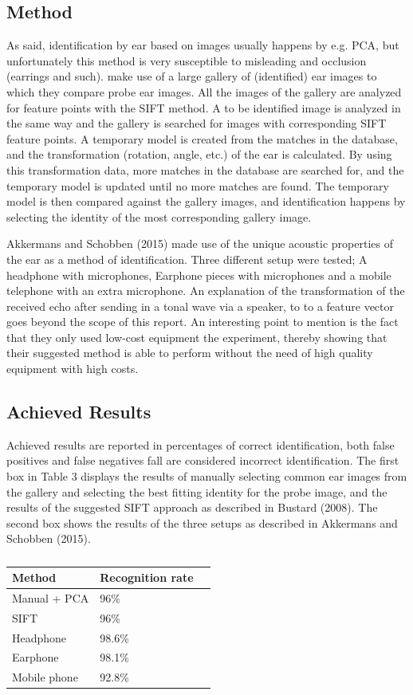 \documentclass{article}
\begin{document}
\subsection{Method}
As said, identification by ear based on images usually happens by e.g. PCA, but unfortunately this method is very susceptible to misleading and occlusion (earrings and such).
\cite{bustard2008robust} make use of a large gallery of (identified) ear images to which they compare probe ear images.
All the images of the gallery are analyzed for feature points with the SIFT\cite{lowe1999object} method.
A to be identified image is analyzed in the same way and the gallery is searched for images with corresponding SIFT feature points.
A temporary model is created from the matches in the database, and the transformation (rotation, angle, etc.) of the ear is calculated.
By using this transformation data, more matches in the database are searched for, and the temporary model is updated until no more matches are found.
The temporary model is then compared against the gallery images, and identification happens by selecting the identity of the most corresponding gallery image.

Akkermans and Schobben (2015) made use of the unique acoustic properties of the ear as a method of identification. 
Three different setup were tested; A headphone with microphones, Earphone pieces with microphones and a mobile telephone with an extra microphone.
An explanation of the transformation of the received echo after sending in a tonal wave via a speaker, to to a feature vector goes beyond the scope of this 
report. An interesting point to mention is the fact that they only used low-cost equipment the experiment,
thereby showing that their suggested method is able to perform without the need of high quality equipment with high costs.

\subsection{Achieved Results}
Achieved results are reported in percentages of correct identification, both false positives and false negatives fall are considered incorrect identification. 
The first box in Table 3 displays the results of manually selecting common ear images from the gallery and selecting the best fitting identity for the probe image,
and the results of the suggested SIFT approach as described in Bustard (2008).
The second box shows the results of the three setups as described in Akkermans and Schobben (2015).
\begin{table}
	\centering
	\begin{tabular}{|l|l|l|}
		\hline
		\textbf{Method} & \textbf{Recognition rate} \\
		\hline
		Manual + PCA & 96\% \\
		SIFT & 96\% \\
		\hline
		Headphone & 98.6\% \\
		Earphone & 98.1\% \\
		Mobile phone & 92.8\% \\
		\hline
	\end{tabular}
	\caption{}
\end{table}
\end{document}
